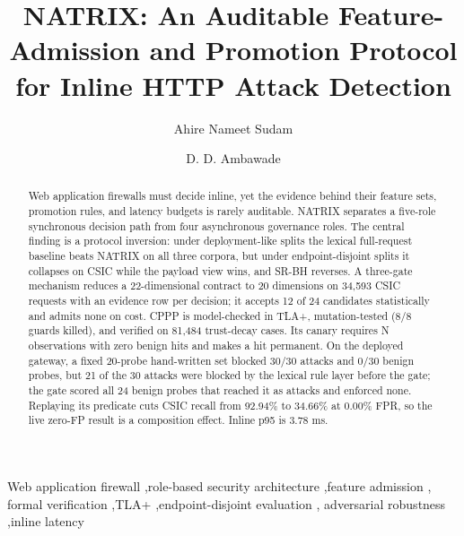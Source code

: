 \documentclass[preprint,11pt]{elsarticle}
\begin{document}
\begin{frontmatter}

\title{NATRIX: An Auditable Feature-Admission and Promotion Protocol for
Inline HTTP Attack Detection}

\author[spit1]{Ahire Nameet Sudam}
\author[spit2]{D. D. Ambawade}
\address[spit1]{Department of Computer Engineering, Sardar Patel Institute of Technology, Munshi Nagar, Andheri (West), Mumbai 400058, Maharashtra, India}
\address[spit2]{Department of Electronics and Telecommunication Engineering, Sardar Patel Institute of Technology, Munshi Nagar, Andheri (West), Mumbai 400058, Maharashtra, India}

\begin{abstract}
Web application firewalls must decide inline, yet the evidence behind
their feature sets, promotion rules, and latency budgets is rarely
auditable. NATRIX separates a five-role synchronous decision path from
four asynchronous governance roles. The central finding is a protocol
inversion: under deployment-like splits the lexical full-request
baseline beats NATRIX on all three corpora, but under endpoint-disjoint
splits it collapses on CSIC while the payload view wins, and SR-BH
reverses. A three-gate mechanism reduces a 22-dimensional contract to 20
dimensions on 34,593 CSIC requests with an evidence row per decision; it
accepts 12 of 24 candidates statistically and admits none on cost. CPPP
is model-checked in TLA+, mutation-tested (8/8 guards killed), and
verified on 81,484 trust-decay cases. Its canary requires N observations
with zero benign hits and makes a hit permanent. On the deployed
gateway, a fixed 20-probe hand-written set blocked 30/30 attacks and
0/30 benign probes, but 21 of the 30 attacks were blocked by the lexical
rule layer before the gate; the gate scored all 24 benign probes that
reached it as attacks and enforced none. Replaying its predicate cuts
CSIC recall from 92.94\% to 34.66\% at 0.00\% FPR, so the live zero-FP
result is a composition effect. Inline p95 is 3.78 ms.
\end{abstract}

\begin{keyword}
Web application firewall \sep role-based security architecture \sep feature admission \sep
formal verification \sep TLA+ \sep endpoint-disjoint evaluation \sep
adversarial robustness \sep inline latency
\end{keyword}

\end{frontmatter}
\end{document}
